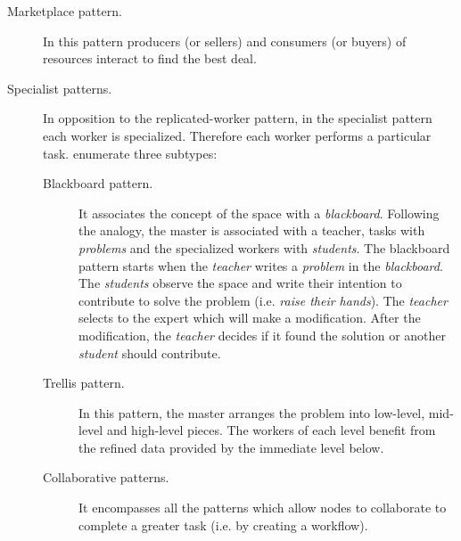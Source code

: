 \begin{description}
  \item[Marketplace pattern.] In this pattern producers (or sellers) and consumers (or buyers) of resources interact to find the best deal. %
  \item[Specialist patterns.] In opposition to the replicated-worker pattern, in the specialist pattern each worker is specialized.
                              Therefore each worker performs a particular task.
                              \citeauthor{freeman_javaspaces_1999} enumerate three subtypes:
			      \begin{description}
				  \item[Blackboard pattern.]
					It associates the concept of the space with a \emph{blackboard}.
					Following the analogy, the master is associated with a teacher, tasks with \emph{problems} and the specialized workers with \emph{students}.
					The blackboard pattern starts when the \emph{teacher} writes a \emph{problem} in the \emph{blackboard}.
					The \emph{students} observe the space and write their intention to contribute to solve the problem (i.e. \emph{raise their hands}).
					The \emph{teacher} selects to the expert which will make a modification.
					After the modification, the \emph{teacher} decides if it found the solution or another \emph{student} should contribute.
				  \item [Trellis pattern.]
					In this pattern, the master arranges the problem into low-level, mid-level and high-level pieces.
					The workers of each level benefit from the refined data provided by the immediate level below.
				  \item [Collaborative patterns.]
					It encompasses all the patterns which allow nodes to collaborate to complete a greater task (i.e. by creating a workflow).
			      \end{description}
\end{description}


